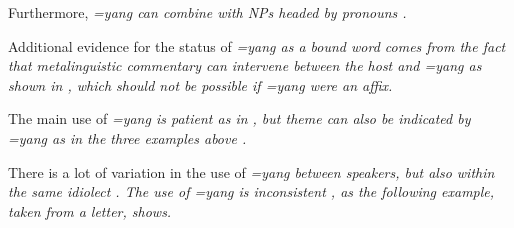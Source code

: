 Furthermore, \em =yang \em can combine with NPs headed by pronouns .


% 
 
Additional evidence for the status of \em =yang \em as a bound word comes from the fact that metalinguistic commentary can intervene between the host and \em =yang \em as shown in , which should not be possible if \em =yang \em were an affix.


The main use of \em =yang \em is patient \citep[24]{Ansaldo2008genesis} as in , but theme can also be indicated by \em =yang \em as in the three examples above .


There is a lot of variation in the use of \em =yang \em between speakers, but also within the same idiolect \citep[cf.][148]{Slomanson2006cll}. The use of \em =yang \em is inconsistent \citep{Ansaldo2005ms, Ansaldo2008genesis}, as the following example, taken from a letter, shows.

